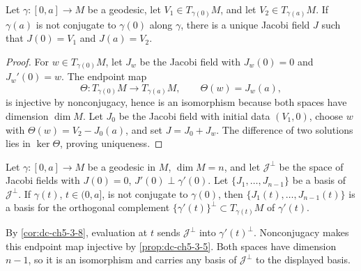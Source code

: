 \begin{proposition}
  \label{prop:dc-ch5-3-9}
  \leanok
  Let $\gamma:[0,a]\to M$ be a geodesic, let
  $V_1\in T_{\gamma(0)}M$, and let $V_2\in T_{\gamma(a)}M$. If $\gamma(a)$ is
  not conjugate to $\gamma(0)$ along $\gamma$, there is a unique Jacobi field
  $J$ such that $J(0)=V_1$ and $J(a)=V_2$.
\end{proposition}
\begin{proof}
  \leanok
  \sketch
  For $w\in T_{\gamma(0)}M$, let $J_w$ be the Jacobi field with
  $J_w(0)=0$ and $J_w'(0)=w$. The endpoint map
  $$
  \Theta:T_{\gamma(0)}M\longrightarrow T_{\gamma(a)}M,\qquad
  \Theta(w)=J_w(a),
  $$
  is injective by nonconjugacy, hence is an isomorphism because both spaces
  have dimension $\dim M$. Let $J_0$ be the Jacobi field with initial data
  $(V_1,0)$, choose $w$ with $\Theta(w)=V_2-J_0(a)$, and set $J=J_0+J_w$.
  The difference of two solutions lies in $\ker\Theta$, proving uniqueness.
\end{proof}

\begin{corollary}
  \label{cor:dc-ch5-3-10}
  \leanok
  Let $\gamma:[0,a]\to M$ be a geodesic in $M$, $\dim M=n$, and let
  $\mathcal{J}^\perp$ be the space of Jacobi fields with $J(0)=0$,
  $J'(0)\perp\gamma'(0)$. Let $\{J_1,\dots,J_{n-1}\}$ be a basis of
  $\mathcal{J}^\perp$. If $\gamma(t)$, $t\in(0,a]$, is not conjugate to $\gamma(0)$,
  then $\{J_1(t),\dots,J_{n-1}(t)\}$ is a basis for the orthogonal complement
  $\{\gamma'(t)\}^\perp\subset T_{\gamma(t)}M$ of $\gamma'(t)$.

  \sketch
  By \cref{cor:dc-ch5-3-8}, evaluation at $t$ sends
  $\mathcal J^\perp$ into $\gamma'(t)^\perp$. Nonconjugacy makes this endpoint
  map injective by \cref{prop:dc-ch5-3-5}. Both spaces have dimension $n-1$,
  so it is an isomorphism and carries any basis of $\mathcal J^\perp$ to the
  displayed basis.
\end{corollary}
